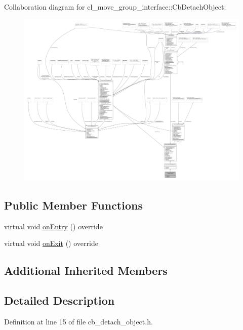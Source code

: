 Collaboration diagram for cl\+\_\+move\+\_\+group\+\_\+interface\+:\+:Cb\+Detach\+Object\+:
\nopagebreak
\begin{figure}[H]
\begin{center}
\leavevmode
\includegraphics[width=350pt]{classcl__move__group__interface_1_1CbDetachObject__coll__graph}
\end{center}
\end{figure}
\subsection*{Public Member Functions}
\begin{DoxyCompactItemize}
\item 
virtual void \hyperlink{classcl__move__group__interface_1_1CbDetachObject_a04af88f1d9b64c43eb2620ac5bd62c35}{on\+Entry} () override
\item 
virtual void \hyperlink{classcl__move__group__interface_1_1CbDetachObject_ae5c6ada3c6631c9fa0bfb2d461ce4678}{on\+Exit} () override
\end{DoxyCompactItemize}
\subsection*{Additional Inherited Members}


\subsection{Detailed Description}


Definition at line 15 of file cb\+\_\+detach\+\_\+object.\+h.



